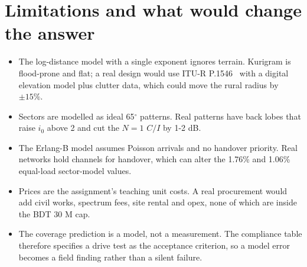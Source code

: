 \documentclass[9pt,a4paper]{extarticle}
\begin{document}
\section{Limitations and what would change the answer}
\begin{itemize}[leftmargin=1.4em,itemsep=1pt,topsep=2pt]
\item The log-distance model with a single exponent ignores terrain. Kurigram is flood-prone and
flat; a real design would use ITU-R P.1546~\cite{p1546} with a digital elevation model plus clutter data, which
could move the rural radius by $\pm15\%$.
\item Sectors are modelled as ideal 65$^\circ$ patterns. Real patterns have back lobes that raise
$i_0$ above 2 and cut the $N=1$ $C/I$ by 1-2 dB.
\item The Erlang-B model assumes Poisson arrivals and no handover priority. Real networks hold
channels for handover, which can alter the 1.76\% and 1.06\% equal-load sector-model values.
\item Prices are the assignment's teaching unit costs. A real procurement would add civil works,
spectrum fees, site rental and opex, none of which are inside the BDT 30 M cap.
\item The coverage prediction is a model, not a measurement. The compliance table therefore
specifies a drive test as the acceptance criterion, so a model error becomes a field finding
rather than a silent failure.
\end{itemize}
\end{document}
